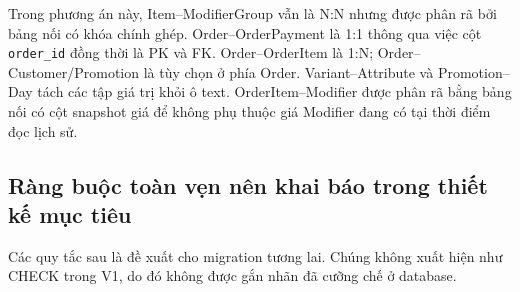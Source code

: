 \documentclass[12pt,a4paper,oneside]{report}
\begin{document}
Trong phương án này, Item–ModifierGroup vẫn là N:N nhưng được phân rã bởi bảng nối có khóa chính ghép. Order–OrderPayment là 1:1 thông qua việc cột \texttt{order\_id} đồng thời là PK và FK. Order–OrderItem là 1:N; Order–Customer/Promotion là tùy chọn ở phía Order. Variant–Attribute và Promotion–Day tách các tập giá trị khỏi ô text. OrderItem–Modifier được phân rã bằng bảng nối có cột snapshot giá để không phụ thuộc giá Modifier đang có tại thời điểm đọc lịch sử.

\subsection{Ràng buộc toàn vẹn nên khai báo trong thiết kế mục tiêu}
Các quy tắc sau là đề xuất cho migration tương lai. Chúng không xuất hiện như CHECK trong V1, do đó không được gắn nhãn đã cưỡng chế ở database.
\end{document}

